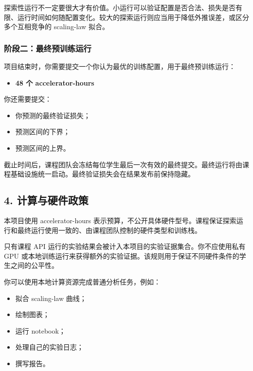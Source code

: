 \documentclass[
  11pt,
]{ctexart}
\providecommand{\tightlist}{%
  \setlength{\itemsep}{0pt}\setlength{\parskip}{0pt}}
\begin{document}
探索性运行不一定要很大才有价值。小运行可以验证配置是否合法、损失是否有限、运行时间如何随配置变化。较大的探索运行则应当用于降低外推误差，或区分多个互相竞争的
scaling-law 拟合。

\hypertarget{ux9636ux6bb5ux4e8cux9690ux85cfux9884ux7b97ux6700ux7ec8ux8fd0ux884c}{%
\subsubsection{阶段二：最终预训练运行}\label{ux9636ux6bb5ux4e8cux9690ux85cfux9884ux7b97ux6700ux7ec8ux8fd0ux884c}}

项目结束时，你需要提交一个你认为最优的训练配置，用于最终预训练运行：

\begin{itemize}
\tightlist
\item
  \textbf{48 个 accelerator-hours}
\end{itemize}

你还需要提交：

\begin{itemize}
\tightlist
\item
  你预测的最终验证损失；
\item
  预测区间的下界；
\item
  预测区间的上界。
\end{itemize}

截止时间后，课程团队会冻结每位学生最后一次有效的最终提交。最终运行将由课程基础设施统一启动。最终验证损失会在结果发布前保持隐藏。

\hypertarget{ux5b98ux65b9ux8ba1ux7b97ux4e0eux786cux4ef6ux653fux7b56}{%
\subsection{4.
计算与硬件政策}\label{ux5b98ux65b9ux8ba1ux7b97ux4e0eux786cux4ef6ux653fux7b56}}

本项目使用 accelerator-hours
表示预算，不公开具体硬件型号。课程保证探索运行和最终运行使用一致的、由课程团队控制的硬件类型和训练栈。

只有课程 API 运行的实验结果会被计入本项目的实验证据集合。你不应使用私有 GPU
或本地训练运行来获得额外的实验证据。该规则用于保证不同硬件条件的学生之间的公平性。

你可以使用本地计算资源完成普通分析任务，例如：

\begin{itemize}
\tightlist
\item
  拟合 scaling-law 曲线；
\item
  绘制图表；
\item
  运行 notebook；
\item
  处理自己的实验日志；
\item
  撰写报告。
\end{itemize}
\end{document}
